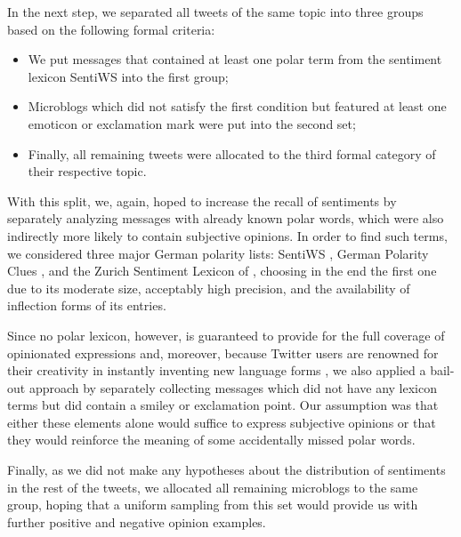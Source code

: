 In the next step, we separated all tweets of the same topic into three
groups based on the following formal criteria:
\begin{itemize}
\item We put messages that contained at least one polar term from the
  sentiment lexicon SentiWS \cite{Remus:10} into the first group;
\item Microblogs which did not satisfy the first condition but
  featured at least one emoticon or exclamation mark were put into the
  second set;
\item Finally, all remaining tweets were allocated to the third formal
  category of their respective topic.
\end{itemize}
With this split, we, again, hoped to increase the recall of sentiments
by separately analyzing messages with already known polar words, which
were also indirectly more likely to contain subjective opinions.  In
order to find such terms, we considered three major German polarity
lists: SentiWS \cite{Remus:10}, German Polarity Clues
\cite{Waltinger:10}, and the Zurich Sentiment Lexicon of
\citet{Clematide:10}, choosing in the end the first one due to its
moderate size, acceptably high precision, and the availability of
inflection forms of its entries.

Since no polar lexicon, however, is guaranteed to provide for the full
coverage of opinionated expressions and, moreover, because Twitter
users are renowned for their creativity in instantly inventing new
language forms \cite{Eisenstein:13}, we also applied a bail-out
approach by separately collecting messages which did not have any
lexicon terms but did contain a smiley or exclamation point.  Our
assumption was that either these elements alone would suffice to
express subjective opinions or that they would reinforce the meaning
of some accidentally missed polar words.

Finally, as we did not make any hypotheses about the distribution of
sentiments in the rest of the tweets, we allocated all remaining
microblogs to the same group, hoping that a uniform sampling from this
set would provide us with further positive and negative opinion
examples.


